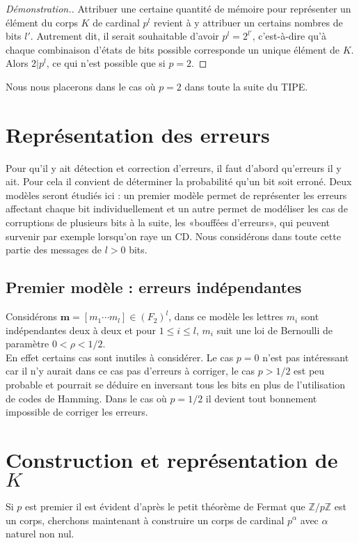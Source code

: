 \documentclass[10pt]{article}
\begin{document}
\begin{proof}[Démonstration.]
Attribuer une certaine quantité de mémoire pour représenter un élément du corps $K$ de cardinal $p^l$ revient à y attribuer un certains nombres de bits $l'$.
Autrement dit, il serait souhaitable d'avoir $p^l = 2^{l'}$, c'est-à-dire qu'à chaque combinaison d'états de bits possible corresponde un unique élément de $K$. Alors $2 | p^l$, ce qui n'est possible que si $p=2$.
\end{proof}

Nous nous placerons dans le cas où $p=2$ dans toute la suite du TIPE.

\section{Représentation des erreurs}
Pour qu'il y ait détection et correction d'erreurs, il faut d'abord qu'erreurs il y ait. Pour cela il convient de déterminer la probabilité qu'un bit soit erroné. Deux modèles seront étudiés ici : un premier modèle permet de représenter les erreurs affectant chaque bit individuellement et un autre permet de modéliser les cas de corruptions de plusieurs bits à la suite, les «bouffées d'erreurs», qui peuvent survenir par exemple lorsqu'on raye un CD. Nous considérons dans toute cette partie des messages de $l>0$ bits.

\subsection{Premier modèle : erreurs indépendantes}

Considérons $\textbf{m}=[m_1 \cdots m_l] \in (F_2)^l$, dans ce modèle les lettres $m_i$ sont indépendantes deux à deux et pour $1 \leq i \leq l$, $m_i$ suit une loi de Bernoulli de paramètre $0<\rho<1/2$.\\
En effet certains cas sont inutiles à considérer. Le cas $p=0$ n'est pas intéressant car il n'y aurait dans ce cas pas d'erreurs à corriger, le cas $p > 1/2$ est peu probable et pourrait se déduire en inversant tous les bits en plus de l'utilisation de codes de Hamming. Dans le cas où $p=1/2$ il devient tout bonnement impossible de corriger les erreurs. 

\section{Construction et représentation de $K$}
Si $p$ est premier il est évident d'après le petit théorème de Fermat que $\mathbb{Z}/p \mathbb{Z}$ est un corps, cherchons maintenant à construire un corps de cardinal $p^{\alpha}$ avec $\alpha$ naturel non nul.
\end{document}
